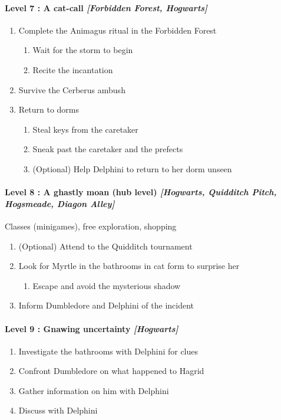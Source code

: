 \paragraph{Level 7 : A cat-call \textit{[Forbidden Forest, Hogwarts]}}
\begin{enumerate}[1)]
	\item Complete the Animagus ritual in the Forbidden Forest
	\begin{enumerate}[1.]
		\item Wait for the storm to begin
		\item Recite the incantation
	\end{enumerate}
	\item Survive the Cerberus ambush
	\item Return to dorms
	\begin{enumerate}[1.]
		\item Steal keys from the caretaker
		\item Sneak past the caretaker and the prefects
		\item (Optional) Help Delphini to return to her dorm unseen
	\end{enumerate}
\end{enumerate}

\paragraph{Level 8 : A ghastly moan (hub level) \textit{[Hogwarts, Quidditch Pitch, Hogsmeade, Diagon Alley]}}

Classes (minigames), free exploration, shopping

\begin{enumerate}[1)]
	\item (Optional) Attend to the Quidditch tournament
	\item Look for Myrtle in the bathrooms in cat form to surprise her
	\begin{enumerate}[1.]
		\item Escape and avoid the mysterious shadow
	\end{enumerate}
	\item Inform Dumbledore and Delphini of the incident
\end{enumerate}

\paragraph{Level 9 : Gnawing uncertainty \textit{[Hogwarts]}}
\begin{enumerate}[1)]
	\item Investigate the bathrooms with Delphini for clues
	\item Confront Dumbledore on what happened to Hagrid
	\item Gather information on him with Delphini
	\item Discuss with Delphini
\end{enumerate}

